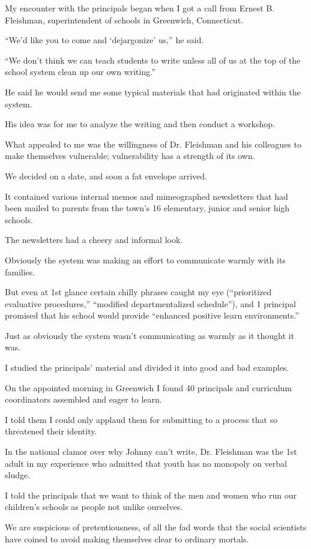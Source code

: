 \documentclass{book}
\numberwithin{equation}{section}
\begin{document}
%
My encounter with the principals began when I got a call from Ernest B. Fleishman, superintendent of schools in Greenwich, Connecticut.

``We'd like you to come and `dejargonize' us,'' he said.

``We don't think we can teach students to write unless all of us at the top of the school system clean up our own writing.''

He said he would send me some typical materials that had originated within the system.

His idea was for me to analyze the writing and then conduct a workshop.

%
What appealed to me was the willingness of Dr. Fleishman and his colleagues to make themselves vulnerable; vulnerability has a strength of its own.

We decided on a date, and soon a fat envelope arrived.

It contained various internal memos and mimeographed newsletters that had been mailed to parents from the town's 16 elementary, junior and senior high schools.

The newsletters had a cheery and informal look.

Obviously the system was making an effort to communicate warmly with its families.

But even at 1st glance certain chilly phrases caught my eye (``prioritized evaluative procedures,'' ``modified departmentalized schedule''), and 1 principal promised that his school would provide ``enhanced positive learn environments.''

Just as obviously the system wasn't communicating as warmly as it thought it was.

%
I studied the principals' material and divided it into good and bad examples.

On the appointed morning in Greenwich I found 40 principals and curriculum coordinators assembled and eager to learn.

I told them I could only applaud them for submitting to a process that so threatened their identity.

In the national clamor over why Johnny can't write, Dr. Fleishman was the 1st adult in my experience who admitted that youth has no monopoly on verbal sludge.

%
I told the principals that we want to think of the men and women who run our children's schools as people not unlike ourselves.

We are suspicious of pretentiousness, of all the fad words that the social scientists have coined to avoid making themselves clear to ordinary mortals.
\end{document}
